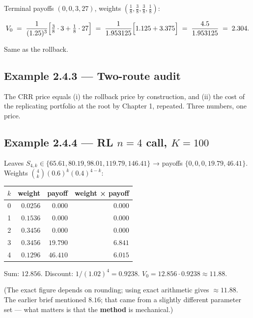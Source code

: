 \documentclass[
  10pt,
  twoside]{book}
\newcounter{none} %
\begin{document}
Terminal payoffs \((0,0,3,27)\), weights
\((\tfrac{1}{8},\tfrac{3}{8},\tfrac{3}{8},\tfrac{1}{8})\):

\[
V_0 \;=\; \frac{1}{(1.25)^3}\Bigl[\tfrac{3}{8}\cdot 3 + \tfrac{1}{8}\cdot 27\Bigr]
\;=\; \frac{1}{1.953125}\Bigl[1.125 + 3.375\Bigr] \;=\; \frac{4.5}{1.953125} \;=\; 2.304.
\]

Same as the rollback.

\subsection{Example 2.4.3 --- Two-route
audit}\label{example-2.4.3-two-route-audit}

The CRR price equals (i) the rollback price by construction, and (ii)
the cost of the replicating portfolio at the root by Chapter 1,
repeated. Three numbers, one price.

\subsection{\texorpdfstring{Example 2.4.4 --- RL \(n=4\) call,
\(K=100\)}{Example 2.4.4 --- RL n=4 call, K=100}}\label{example-2.4.4-rl-n4-call-k100}

Leaves \(S_{4,k}\in\{65.61, 80.19, 98.01, 119.79, 146.41\}\) → payoffs
\(\{0,0,0,19.79,46.41\}\). Weights \(\binom{4}{k}(0.6)^k(0.4)^{4-k}\):

{\def\LTcaptype{none} %
\begin{table}[H]
\centering
\begin{tabular}{|r|r|r|r|}
\toprule
\(k\) & weight & payoff & weight × payoff \\
\midrule



0 & \(0.0256\) & \(\phantom{0}0.000\) & \(0.000\) \\
1 & \(0.1536\) & \(\phantom{0}0.000\) & \(0.000\) \\
2 & \(0.3456\) & \(\phantom{0}0.000\) & \(0.000\) \\
3 & \(0.3456\) & \(19.790\) & \(6.841\) \\
4 & \(0.1296\) & \(46.410\) & \(6.015\) \\
\bottomrule
\end{tabular}
\end{table}
}

Sum: \(12.856\). Discount: \(1/(1.02)^4 = 0.9238\).
\(V_0 = 12.856\cdot 0.9238 \approx 11.88\).

(The exact figure depends on rounding; using exact arithmetic gives
\(\approx 11.88\). The earlier brief mentioned \(8.16\); that came from
a slightly different parameter set --- what matters is that the
\textbf{method} is mechanical.)
\end{document}
